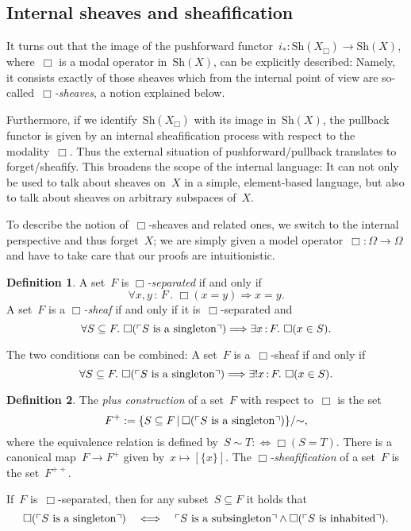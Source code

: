 \documentclass[10pt]{amsart}
\theoremstyle{definition}
\newtheorem{defn}{Definition}[section]
\theoremstyle{plain}
\theoremstyle{remark}
\newcommand{\Sh}{\mathrm{Sh}}
\newcommand{\?}{\,{:}\,}
\renewcommand{\_}{\mathpunct{.}\,}
\newcommand{\speak}[1]{\ulcorner\text{\textnormal{#1}}\urcorner}
\begin{document}
\subsection{Internal sheaves and sheafification} It turns out that the image of
the pushforward functor~$i_* : \Sh(X_\Box) \to \Sh(X)$, where~$\Box$ is a modal
operator in~$\Sh(X)$, can be explicitly described: Namely, it consists exactly
of those sheaves which from the internal point of view
are so-called~\emph{$\Box$-sheaves}, a notion explained below.

Furthermore, if we identify~$\Sh(X_\Box)$ with its image in~$\Sh(X)$, the
pullback functor is given by an internal sheafification process with respect to
the modality~$\Box$. Thus the external situation of pushforward/pullback
translates to forget/sheafify. This broadens the scope of the internal
language: It can not only be used to talk about sheaves on~$X$ in a simple,
element-based language, but also to talk about sheaves on arbitrary subspaces
of~$X$.

To describe the notion of~$\Box$-sheaves and related ones, we switch to the internal
perspective and thus forget~$X$; we are simply given a model operator~$\Box :
\Omega \to \Omega$ and have to take care that our proofs are intuitionistic.

\begin{defn}\label{defn:box-sheaves}
A set~$F$ is \emph{$\Box$-separated} if and only if
\[ \forall x,y\?F\_ \Box(x = y) \Longrightarrow x = y. \]
A set~$F$ is a \emph{$\Box$-sheaf} if and only if it is~$\Box$-separated and
\[ \forall S \subseteq F\_
  \Box(\speak{$S$ is a singleton}) \Longrightarrow
  \exists x\?F\_ \Box(x \in S). \]
\end{defn}

The two conditions can be combined: A set~$F$ is a~$\Box$-sheaf if and only if
\[ \forall S \subseteq F\_
  \Box(\speak{$S$ is a singleton}) \Longrightarrow
  \exists! x\?F\_ \Box(x \in S). \]

\begin{defn}The \emph{plus construction} of a set~$F$ with respect to~$\Box$ is the set
\[ F^+ := \{ S \subseteq F \,|\, \Box(\speak{$S$ is a singleton}) \}/{\sim},
\]
where the equivalence relation is defined by~$S \sim T :\Leftrightarrow
\Box(S = T)$. There is a canonical map~$F \to F^+$ given by~$x \mapsto
[\{x\}]$. The \emph{$\Box$-sheafi\-fi\-ca\-tion} of a set~$F$ is the
set~$F^{++}$.
\end{defn}

If~$F$ is~$\Box$-separated, then for any subset~$S \subseteq F$ it holds
that
\[ \Box(\speak{$S$ is a singleton}) \quad\Longleftrightarrow\quad
  \speak{$S$ is a subsingleton} \wedge \Box(\speak{$S$ is inhabited}). \]
\end{document}
